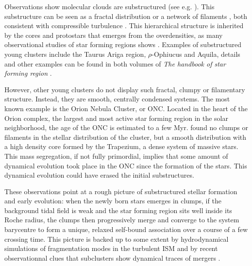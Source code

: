 Observations show molecular clouds are substructured (see e.g. \citealt{Cambresy1999}). This substructure can be seen as a fractal distribution \citep{Elmegreen1996} or a network of filaments \citep{Andre2010}, both consistent with compressible turbulence \citep{McKee2007}	. This hierarchical structure is inherited by the cores and protostars that emerges from the overdensities, as many observational studies of star forming regions shows \citep{Schneider1979,Hartmann2002,Bressert2010}. Examples of substructured young clusters include the Taurus Ariga region, $\rho$-Ophiucus and Aquila, details and other examples can be found in both volumes of \textit{The handbook of star forming region} \cite{Reipurth2008}.  

However, other young clusters do not display such fractal, clumpy or filamentary structure. Instead, they are smooth, centrally condensed systems. The most known example is the Orion Nebula Cluster, or ONC. Located in the heart of the Orion complex, the largest and most active star forming region in the solar neighborhood, the age of the ONC is estimated to a few Myr. \cite{Hillenbrand1998} found no clumps or filaments in the stellar distribution of the cluster, but a smooth distribution with a high density core formed by the Trapezium, a dense system of massive stars. This mass segregation, if not fully primordial, implies that some amount of dynamical evolution took place in the ONC since the formation of the stars. This dynamical evolution could have erased the initial substructures.

These observations point at a rough picture of substructured stellar formation and early evolution: when the newly born stars emerges in clumps, if the background tidal field is weak and the star forming region sits well inside its Roche radius, the clumps then progressively merge and converge to the system barycentre to form a unique, relaxed  self-bound association over a  course of a few crossing time. This picture is backed up to some extent by hydrodynamical simulations of fragmentation modes in the turbulent ISM \citep{Klessen2000,Bate2003,MacLow2004,Offner2009,Maschberger2010} and by recent observationnal clues that subclusters show dynamical traces of mergers \citep{Kuhn2015b}. 

